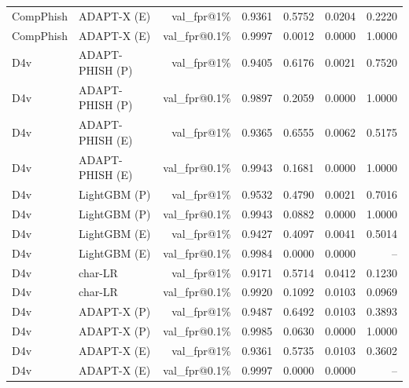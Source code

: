 \begin{table}[t]
\begin{tabular}{llrrrrr}
CompPhish & ADAPT-X (E) & val\_fpr@1\% & 0.9361 & 0.5752 & 0.0204 & 0.2220 \\
CompPhish & ADAPT-X (E) & val\_fpr@0.1\% & 0.9997 & 0.0012 & 0.0000 & 1.0000 \\
D4v & ADAPT-PHISH (P) & val\_fpr@1\% & 0.9405 & 0.6176 & 0.0021 & 0.7520 \\
D4v & ADAPT-PHISH (P) & val\_fpr@0.1\% & 0.9897 & 0.2059 & 0.0000 & 1.0000 \\
D4v & ADAPT-PHISH (E) & val\_fpr@1\% & 0.9365 & 0.6555 & 0.0062 & 0.5175 \\
D4v & ADAPT-PHISH (E) & val\_fpr@0.1\% & 0.9943 & 0.1681 & 0.0000 & 1.0000 \\
D4v & LightGBM (P) & val\_fpr@1\% & 0.9532 & 0.4790 & 0.0021 & 0.7016 \\
D4v & LightGBM (P) & val\_fpr@0.1\% & 0.9943 & 0.0882 & 0.0000 & 1.0000 \\
D4v & LightGBM (E) & val\_fpr@1\% & 0.9427 & 0.4097 & 0.0041 & 0.5014 \\
D4v & LightGBM (E) & val\_fpr@0.1\% & 0.9984 & 0.0000 & 0.0000 & -- \\
D4v & char-LR & val\_fpr@1\% & 0.9171 & 0.5714 & 0.0412 & 0.1230 \\
D4v & char-LR & val\_fpr@0.1\% & 0.9920 & 0.1092 & 0.0103 & 0.0969 \\
D4v & ADAPT-X (P) & val\_fpr@1\% & 0.9487 & 0.6492 & 0.0103 & 0.3893 \\
D4v & ADAPT-X (P) & val\_fpr@0.1\% & 0.9985 & 0.0630 & 0.0000 & 1.0000 \\
D4v & ADAPT-X (E) & val\_fpr@1\% & 0.9361 & 0.5735 & 0.0103 & 0.3602 \\
D4v & ADAPT-X (E) & val\_fpr@0.1\% & 0.9997 & 0.0000 & 0.0000 & -- \\
\bottomrule
\end{tabular}
\end{table}